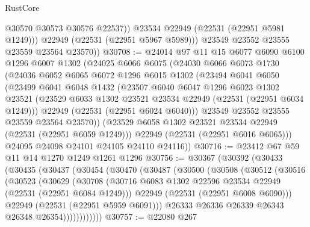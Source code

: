 \begin{lexlean}{RustCore}
\begin{coremodule}
                @30570
                @30573
                @30576
                @22537))
            @23534
            @22949
            (@22531 (@22951 @5981 @1249)))
          @22949
          (@22531 (@22951 @5967 @5989)))
        @23549
        @23552
        @23555
        @23559
        @23564
        @23570))
@30708 := @24014
    @97
    @11
    @15
    @6077
    @6090
    @6100
    @1296
    @6007
    @1302
    (@24025
      @6066
      @6075
      (@24030
        @6066
        @6073
        @1730
        (@24036
          @6052
          @6065
          @6072
          @1296
          @6015
          @1302
          (@23494
            @6041
            @6050
            (@23499
              @6041
              @6048
              @1432
              (@23507
                @6040
                @6047
                @1296
                @6023
                @1302
                @23521
                (@23529 @6033 @1302 @23521 @23534 @22949 (@22531 (@22951 @6034 @1249)))
                @22949
                (@22531 (@22951 @6024 @6040)))
              @23549
              @23552
              @23555
              @23559
              @23564
              @23570))
          (@23529 @6058 @1302 @23521 @23534 @22949 (@22531 (@22951 @6059 @1249)))
          @22949
          (@22531 (@22951 @6016 @6065)))
        @24095
        @24098
        @24101
        @24105
        @24110
        @24116))
@30716 := @23412 @67 @59 @11 @14 @1270 @1249 @1261 @1296
@30756 := @30367
    (@30392
      (@30433
        (@30435
          (@30437
            (@30454
              (@30470
                (@30487
                  (@30500
                    (@30508
                      (@30512
                        (@30516
                          (@30523
                            (@30629
                              (@30708
                                (@30716
                                  @6083
                                  @1302
                                  @22596
                                  @23534
                                  @22949
                                  (@22531 (@22951 @6084 @1249)))
                                @22949
                                (@22531 (@22951 @6008 @6090)))
                              @22949
                              (@22531 (@22951 @5959 @6091)))
                            @26333
                            @26336
                            @26339
                            @26343
                            @26348
                            @26354))))))))))))
@30757 := @22080 @267

\end{coremodule}
\end{lexlean}

